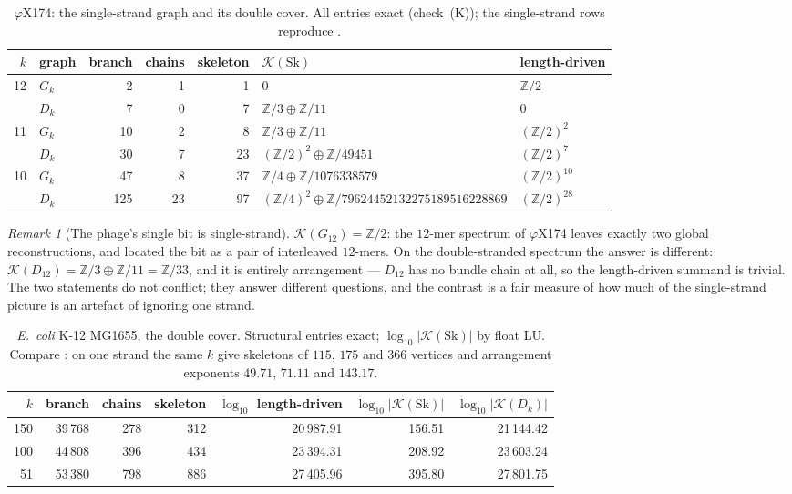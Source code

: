 \documentclass[11pt]{article}
\theoremstyle{plain}
\theoremstyle{definition}
\theoremstyle{remark}
\newtheorem{remark}[theorem]{Remark}
\newcommand{\Z}{\mathbb{Z}}
\newcommand{\K}{\mathcal{K}}
\newcommand{\Sk}{\mathrm{Sk}}
\begin{document}
\begin{table}[ht]
\centering\footnotesize
\begin{tabular}{rlrrrll}
\toprule
$k$ & graph & branch & chains & skeleton & $\K(\Sk)$ & length-driven\\
\midrule
12 & $G_k$ &   2 &  1 &  1 & $0$ & $\Z/2$\\
   & $D_k$ &   7 &  0 &  7 & $\Z/3\oplus\Z/11$ & $0$\\[2pt]
11 & $G_k$ &  10 &  2 &  8 & $\Z/3\oplus\Z/11$ & $(\Z/2)^{2}$\\
   & $D_k$ &  30 &  7 & 23 & $(\Z/2)^{2}\oplus\Z/49451$ & $(\Z/2)^{7}$\\[2pt]
10 & $G_k$ &  47 &  8 & 37 & $\Z/4\oplus\Z/1076338579$ & $(\Z/2)^{10}$\\
   & $D_k$ & 125 & 23 & 97 & $(\Z/4)^{2}\oplus\Z/79624452132275189516228869$ & $(\Z/2)^{28}$\\
\bottomrule
\end{tabular}
\caption{$\varphi$X174: the single-strand graph and its double cover. All entries exact
(check~(K)); the single-strand rows reproduce \cite[Tab.~1]{Bio3}.}
\label{tab:phix}
\end{table}

\begin{remark}[The phage's single bit is single-strand]\label{rem:bit}
$\K(G_{12})=\Z/2$: the $12$-mer spectrum of $\varphi$X174 leaves exactly two global
reconstructions, and \cite{Bio2} located the bit as a pair of interleaved $12$-mers. On
the double-stranded spectrum the answer is different: $\K(D_{12})=\Z/3\oplus\Z/11=\Z/33$,
and it is entirely arrangement --- $D_{12}$ has no bundle chain at all, so the
length-driven summand is trivial. The two statements do not conflict; they answer
different questions, and the contrast is a fair measure of how much of the single-strand
picture is an artefact of ignoring one strand.
\end{remark}

\begin{table}[ht]
\centering\small
\begin{tabular}{rrrrrrr}
\toprule
$k$ & branch & chains & skeleton & $\log_{10}$ length-driven & $\log_{10}|\K(\Sk)|$
& $\log_{10}|\K(D_k)|$\\
\midrule
150 & 39\,768 & 278 & 312 & 20\,987.91 & 156.51 & 21\,144.42\\
100 & 44\,808 & 396 & 434 & 23\,394.31 & 208.92 & 23\,603.24\\
 51 & 53\,380 & 798 & 886 & 27\,405.96 & 395.80 & 27\,801.75\\
\bottomrule
\end{tabular}
\caption{\emph{E.\ coli} K-12 MG1655, the double cover. Structural entries exact;
$\log_{10}|\K(\Sk)|$ by float LU. Compare \cite[Tab.~1]{Bio5}: on one strand the same $k$
give skeletons of $115$, $175$ and $366$ vertices and arrangement exponents $49.71$,
$71.11$ and $143.17$.}
\label{tab:ecoli}
\end{table}
\end{document}
